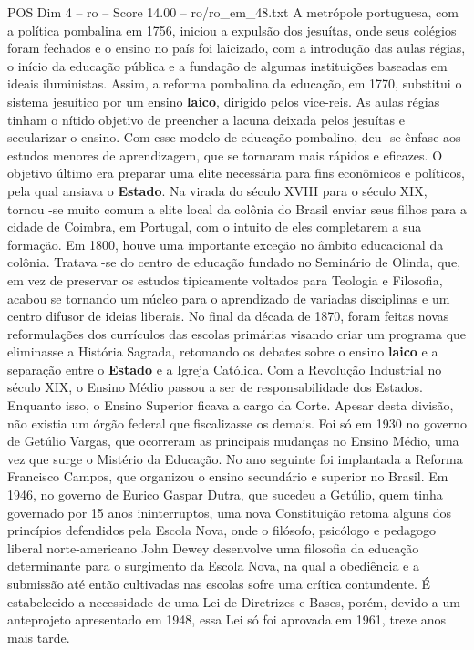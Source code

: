 \begin{textsample}{POS Dim 4 – ro – Score 14.00 – ro/ro\_em\_48.txt}
A metrópole portuguesa, com a política pombalina em 1756, iniciou a expulsão dos jesuítas, onde seus colégios foram fechados e o ensino no país foi laicizado, com a introdução das aulas régias, o início da educação pública e a fundação de algumas instituições baseadas em ideais iluministas.
Assim, a reforma pombalina da educação, em 1770, substitui o sistema jesuítico por um ensino \textbf{laico}, dirigido pelos vice-reis.
As aulas régias tinham o nítido objetivo de preencher a lacuna deixada pelos jesuítas e secularizar o ensino.
Com esse modelo de educação pombalino, deu -se ênfase aos estudos menores de aprendizagem, que se tornaram mais rápidos e eficazes.
O objetivo último era preparar uma elite necessária para fins econômicos e políticos, pela qual ansiava o \textbf{Estado}.
Na virada do século XVIII para o século XIX, tornou -se muito comum a elite local da colônia do Brasil enviar seus filhos para a cidade de Coimbra, em Portugal, com o intuito de eles completarem a sua formação.
Em 1800, houve uma importante exceção no âmbito educacional da colônia.
Tratava -se do centro de educação fundado no Seminário de Olinda, que, em vez de preservar os estudos tipicamente voltados para Teologia e Filosofia, acabou se tornando um núcleo para o aprendizado de variadas disciplinas e um centro difusor de ideias liberais.
No final da década de 1870, foram feitas novas reformulações dos currículos das escolas primárias visando criar um programa que eliminasse a História Sagrada, retomando os debates sobre o ensino \textbf{laico} e a separação entre o \textbf{Estado} e a Igreja Católica.
Com a Revolução Industrial no século XIX, o Ensino Médio passou a ser de responsabilidade dos Estados.
Enquanto isso, o Ensino Superior ficava a cargo da Corte.
Apesar desta divisão, não existia um órgão federal que fiscalizasse os demais.
Foi só em 1930 no governo de Getúlio Vargas, que ocorreram as principais mudanças no Ensino Médio, uma vez que surge o Mistério da Educação.
No ano seguinte foi implantada a Reforma Francisco Campos, que organizou o ensino secundário e superior no Brasil.
Em 1946, no governo de Eurico Gaspar Dutra, que sucedeu a Getúlio, quem tinha governado por 15 anos ininterruptos, uma nova Constituição retoma alguns dos princípios defendidos pela Escola Nova, onde o filósofo, psicólogo e pedagogo liberal norte-americano John Dewey desenvolve uma filosofia da educação determinante para o surgimento da Escola Nova, na qual a obediência e a submissão até então cultivadas nas escolas sofre uma crítica contundente.
É estabelecido a necessidade de uma Lei de Diretrizes e Bases, porém, devido a um anteprojeto apresentado em 1948, essa Lei só foi aprovada em 1961, treze anos mais tarde.

\end{textsample}
